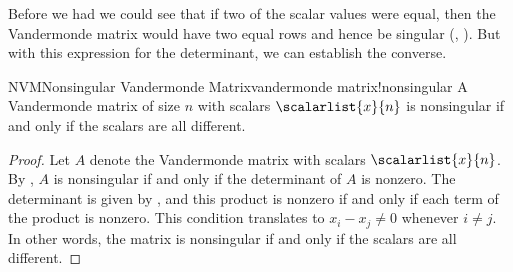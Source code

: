 %
Before we had  we could see that if two of the scalar values were equal, then the Vandermonde matrix would have two equal rows and hence be singular (, ).  But with this expression for the determinant, we can establish the converse.
%
\begin{theorem}{NVM}{Nonsingular Vandermonde Matrix}{vandermonde matrix!nonsingular}
A Vandermonde matrix of size $n$ with scalars $\scalarlist{x}{n}$ is nonsingular if and only if the scalars are all different.
\end{theorem}
%
\begin{proof}
%
Let $A$ denote the Vandermonde matrix with scalars $\scalarlist{x}{n}$.  By , $A$ is nonsingular if and only if the determinant of $A$ is nonzero.  The determinant is given by , and this product is nonzero if and only if each term of the product is nonzero.  This condition translates to $x_i-x_j\neq 0$ whenever $i\neq j$.  In other words, the matrix is nonsingular if and only if the scalars are all different.
%
\end{proof}
%
